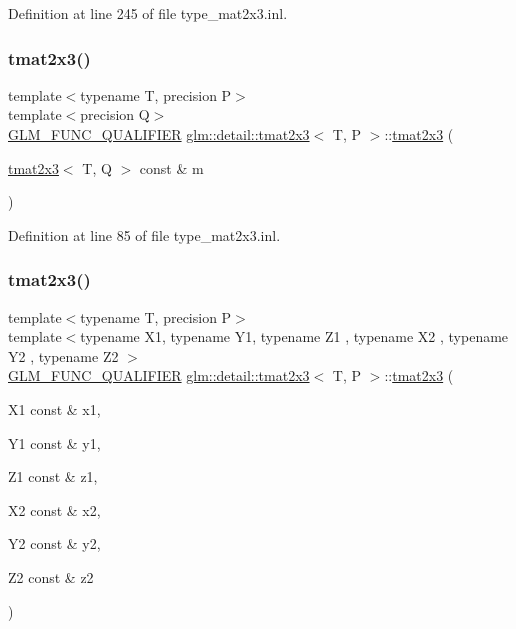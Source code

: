 Definition at line 245 of file type\+\_\+mat2x3.\+inl.

\mbox{\label{structglm_1_1detail_1_1tmat2x3_ad87db0132efbb006cabcb3a833c516ba}} 
\subsubsection{\texorpdfstring{tmat2x3()}{tmat2x3()}\hspace{0.1cm}{\footnotesize\ttfamily [19/22]}}
{\footnotesize\ttfamily template$<$typename T, precision P$>$ \\
template$<$precision Q$>$ \\
\hyperlink{setup_8hpp_a33fdea6f91c5f834105f7415e2a64407}{G\+L\+M\+\_\+\+F\+U\+N\+C\+\_\+\+Q\+U\+A\+L\+I\+F\+I\+ER} \hyperlink{structglm_1_1detail_1_1tmat2x3}{glm\+::detail\+::tmat2x3}$<$ T, P $>$\+::\hyperlink{structglm_1_1detail_1_1tmat2x3}{tmat2x3} (\begin{DoxyParamCaption}\item[{\hyperlink{structglm_1_1detail_1_1tmat2x3}{tmat2x3}$<$ T, Q $>$ const \&}]{m }\end{DoxyParamCaption})}



Definition at line 85 of file type\+\_\+mat2x3.\+inl.

\mbox{\label{structglm_1_1detail_1_1tmat2x3_a4314c8e147d0c2d536781f1743787ab0}} 
\subsubsection{\texorpdfstring{tmat2x3()}{tmat2x3()}\hspace{0.1cm}{\footnotesize\ttfamily [20/22]}}
{\footnotesize\ttfamily template$<$typename T, precision P$>$ \\
template$<$typename X1, typename Y1, typename Z1 , typename X2 , typename Y2 , typename Z2 $>$ \\
\hyperlink{setup_8hpp_a33fdea6f91c5f834105f7415e2a64407}{G\+L\+M\+\_\+\+F\+U\+N\+C\+\_\+\+Q\+U\+A\+L\+I\+F\+I\+ER} \hyperlink{structglm_1_1detail_1_1tmat2x3}{glm\+::detail\+::tmat2x3}$<$ T, P $>$\+::\hyperlink{structglm_1_1detail_1_1tmat2x3}{tmat2x3} (\begin{DoxyParamCaption}\item[{X1 const \&}]{x1,  }\item[{Y1 const \&}]{y1,  }\item[{Z1 const \&}]{z1,  }\item[{X2 const \&}]{x2,  }\item[{Y2 const \&}]{y2,  }\item[{Z2 const \&}]{z2 }\end{DoxyParamCaption})}



